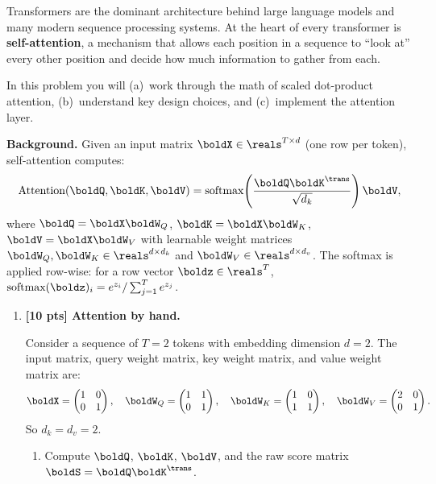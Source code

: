 \documentclass[submit]{../harvardml}
\begin{document}
\begin{problem}

Transformers are the dominant architecture behind large language models and many modern
sequence processing systems.  At the heart of every transformer is \textbf{self-attention},
a mechanism that allows each position in a sequence to ``look at'' every other position
and decide how much information to gather from each.

In this problem you will (a)~work through the math of scaled dot-product attention,
(b)~understand key design choices, and (c)~implement the attention layer.

\medskip\noindent
\textbf{Background.}
Given an input matrix $\boldX \in \reals^{T \times d}$ (one row per token),
self-attention computes:
\[
  \text{Attention}(\boldQ, \boldK, \boldV)
  = \text{softmax}\!\left(\frac{\boldQ \boldK^\trans}{\sqrt{d_k}}\right)\boldV,
\]
where $\boldQ = \boldX \boldW_Q$, $\boldK = \boldX \boldW_K$,
$\boldV = \boldX \boldW_V$ with learnable weight matrices
$\boldW_Q, \boldW_K \in \reals^{d \times d_k}$ and
$\boldW_V \in \reals^{d \times d_v}$.
The softmax is applied row-wise: for a row vector $\boldz \in \reals^T$,
$\text{softmax}(\boldz)_i = e^{z_i} / \sum_{j=1}^{T} e^{z_j}$.

\begin{enumerate}

\item \textbf{[10 pts] Attention by hand.}

Consider a sequence of $T = 2$ tokens with embedding dimension $d = 2$. The input
matrix, query weight matrix, key weight matrix, and value weight matrix are:
\[
  \boldX = \begin{pmatrix} 1 & 0 \\ 0 & 1 \end{pmatrix}, \quad
  \boldW_Q = \begin{pmatrix} 1 & 1 \\ 0 & 1 \end{pmatrix}, \quad
  \boldW_K = \begin{pmatrix} 1 & 0 \\ 1 & 1 \end{pmatrix}, \quad
  \boldW_V = \begin{pmatrix} 2 & 0 \\ 0 & 1 \end{pmatrix}.
\]
So $d_k = d_v = 2$.

\begin{enumerate}
  \item Compute $\boldQ$, $\boldK$, $\boldV$, and the raw score matrix
  $\boldS = \boldQ \boldK^\trans$.


\end{enumerate}
\end{enumerate}
\end{problem}
\end{document}

